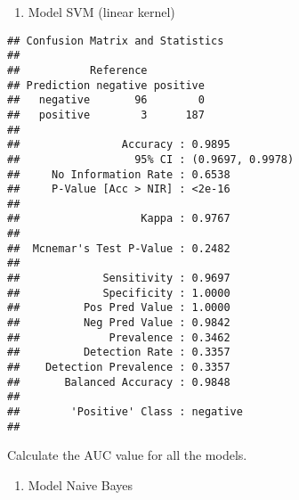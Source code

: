 \documentclass[]{article}
\newenvironment{Shaded}{\begin{snugshade}}{\end{snugshade}}
\newcommand{\DataTypeTok}[1]{\textcolor[rgb]{0.13,0.29,0.53}{#1}}
\newcommand{\KeywordTok}[1]{\textcolor[rgb]{0.13,0.29,0.53}{\textbf{#1}}}
\newcommand{\NormalTok}[1]{#1}
\newcommand{\OperatorTok}[1]{\textcolor[rgb]{0.81,0.36,0.00}{\textbf{#1}}}
\newcommand{\StringTok}[1]{\textcolor[rgb]{0.31,0.60,0.02}{#1}}
\providecommand{\tightlist}{%
  \setlength{\itemsep}{0pt}\setlength{\parskip}{0pt}}
\begin{document}
\begin{enumerate}
\def\labelenumi{\arabic{enumi}.}
\setcounter{enumi}{4}
\tightlist
\item
  Model SVM (linear kernel)
\end{enumerate}

\begin{Shaded}
\end{Shaded}

\begin{verbatim}
## Confusion Matrix and Statistics
## 
##           Reference
## Prediction negative positive
##   negative       96        0
##   positive        3      187
##                                           
##                Accuracy : 0.9895          
##                  95% CI : (0.9697, 0.9978)
##     No Information Rate : 0.6538          
##     P-Value [Acc > NIR] : <2e-16          
##                                           
##                   Kappa : 0.9767          
##                                           
##  Mcnemar's Test P-Value : 0.2482          
##                                           
##             Sensitivity : 0.9697          
##             Specificity : 1.0000          
##          Pos Pred Value : 1.0000          
##          Neg Pred Value : 0.9842          
##              Prevalence : 0.3462          
##          Detection Rate : 0.3357          
##    Detection Prevalence : 0.3357          
##       Balanced Accuracy : 0.9848          
##                                           
##        'Positive' Class : negative        
## 
\end{verbatim}

Calculate the AUC value for all the models.

\begin{enumerate}
\def\labelenumi{\arabic{enumi}.}
\tightlist
\item
  Model Naive Bayes
\end{enumerate}

\begin{Shaded}
\end{Shaded}
\end{document}

